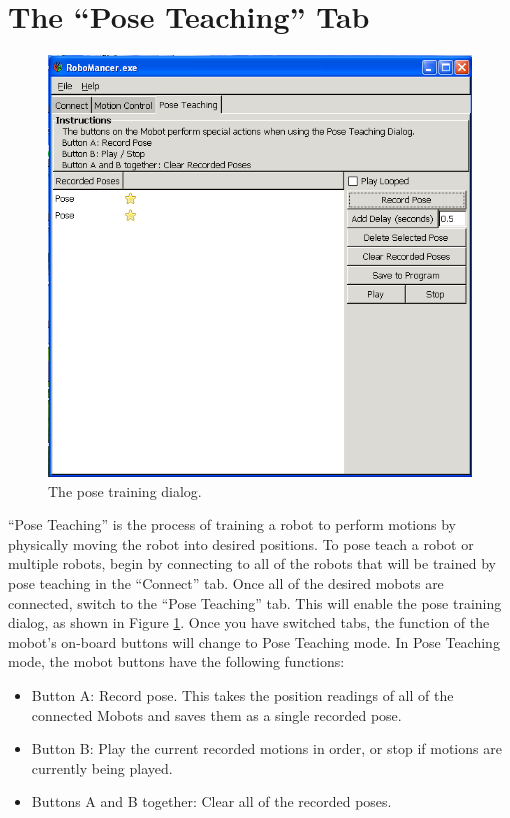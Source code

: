 \documentclass{article}
\begin{document}
\section{The ``Pose Teaching'' Tab}
\begin{figure}[H]
\begin{center}
\includegraphics[width=4.5in]{images/posetrain.png}
\end{center}
\caption{\label{fig:posetrain.png} The pose training dialog.}
\end{figure}

``Pose Teaching'' is the process of training a robot to perform motions by physically
moving the robot into desired positions. To pose teach a robot or multiple robots,
begin by connecting to all of the robots that will be trained by pose teaching
in the ``Connect'' tab. Once all of the desired mobots are connected, switch to
the ``Pose Teaching'' tab. This will enable the pose training dialog, as shown
in Figure \ref{fig:posetrain.png}.  Once you have switched tabs, the function of the
mobot's on-board buttons will change to Pose Teaching mode. In Pose Teaching mode,
the mobot buttons have the following functions:
\begin{itemize}
\item Button A: Record pose. This takes the position readings of all of the
connected Mobots and saves them as a single recorded pose.
\item Button B: Play the current recorded motions in order, or stop if motions are currently being played.
\item Buttons A and B together: Clear all of the recorded poses.
\end{itemize}
\end{document}
